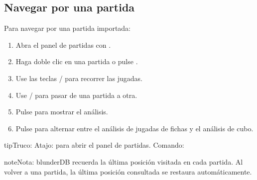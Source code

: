 \documentclass[letterpaper,10pt,spanish]{sphinxmanual}
\begin{document}
\subsection{Navegar por una partida}
\label{\detokenize{guide_utilisateur:naviguer-dans-un-match}}
\sphinxAtStartPar
Para navegar por una partida importada:
\begin{enumerate}
%
\item {} 
\sphinxAtStartPar
Abra el panel de partidas con .

\item {} 
\sphinxAtStartPar
Haga doble clic en una partida o pulse .

\item {} 
\sphinxAtStartPar
Use las teclas  /  para recorrer las jugadas.

\item {} 
\sphinxAtStartPar
Use  /  para pasar de una partida a otra.

\item {} 
\sphinxAtStartPar
Pulse  para mostrar el análisis.

\item {} 
\sphinxAtStartPar
Pulse  para alternar entre el análisis de jugadas de fichas y el análisis de cubo.

\end{enumerate}

\begin{sphinxadmonition}{tip}{Truco:}
\sphinxAtStartPar
Atajo:  para abrir el panel de partidas. Comando: 
\end{sphinxadmonition}

\begin{sphinxadmonition}{note}{Nota:}
\sphinxAtStartPar
blunderDB recuerda la última posición visitada en cada partida. Al volver a una partida, la última posición consultada se restaura automáticamente.
\end{sphinxadmonition}
\end{document}
